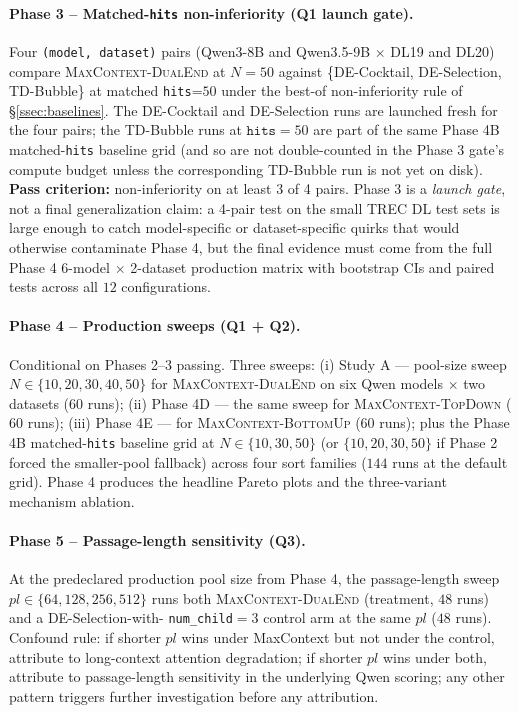 \paragraph{Phase 3 -- Matched-\texttt{hits} non-inferiority (Q1 launch gate).}
Four \texttt{(model, dataset)} pairs (Qwen3-8B and Qwen3.5-9B $\times$ DL19
and DL20) compare \textsc{MaxContext-DualEnd} at $N{=}50$ against
\{DE-Cocktail, DE-Selection, TD-Bubble\} at matched \texttt{hits}{=}$50$
under the best-of non-inferiority rule of \S\ref{ssec:baselines}. The
DE-Cocktail and DE-Selection runs are launched fresh for the four pairs;
the TD-Bubble runs at $\texttt{hits}{=}50$ are part of the same Phase 4B
matched-\texttt{hits} baseline grid (and so are not double-counted in the
Phase 3 gate's compute budget unless the corresponding TD-Bubble run is
not yet on disk). \textbf{Pass criterion:} non-inferiority on at least 3
of 4 pairs. Phase 3 is a \emph{launch gate}, not a final generalization
claim: a 4-pair test on the small TREC DL test sets is large enough to
catch model-specific or dataset-specific quirks that would otherwise
contaminate Phase 4, but the final evidence must come from the full Phase
4 6-model $\times$ 2-dataset production matrix with bootstrap CIs and
paired tests across all $12$ configurations.

\paragraph{Phase 4 -- Production sweeps (Q1 + Q2).}
Conditional on Phases 2--3 passing. Three sweeps:
(i) Study A --- pool-size sweep $N \in \{10,20,30,40,50\}$ for
\textsc{MaxContext-DualEnd} on six Qwen models $\times$ two datasets ($60$
runs);
(ii) Phase 4D --- the same sweep for \textsc{MaxContext-TopDown} ($60$ runs);
(iii) Phase 4E --- for \textsc{MaxContext-BottomUp} ($60$ runs);
plus the Phase 4B matched-\texttt{hits} baseline grid at $N \in \{10,30,50\}$
(or $\{10,20,30,50\}$ if Phase 2 forced the smaller-pool fallback) across
four sort families ($144$ runs at the default grid). Phase 4 produces the
headline Pareto plots and the three-variant mechanism ablation.

\paragraph{Phase 5 -- Passage-length sensitivity (Q3).}
At the predeclared production pool size from Phase 4, the passage-length
sweep $pl \in \{64, 128, 256, 512\}$ runs both
\textsc{MaxContext-DualEnd} (treatment, $48$ runs) and a DE-Selection-with-
\texttt{num\_child}$=$$3$ control arm at the same $pl$ ($48$ runs).
Confound rule: if shorter $pl$ wins under MaxContext but not under the
control, attribute to long-context attention degradation; if shorter $pl$
wins under both, attribute to passage-length sensitivity in the underlying
Qwen scoring; any other pattern triggers further investigation before any
attribution.

